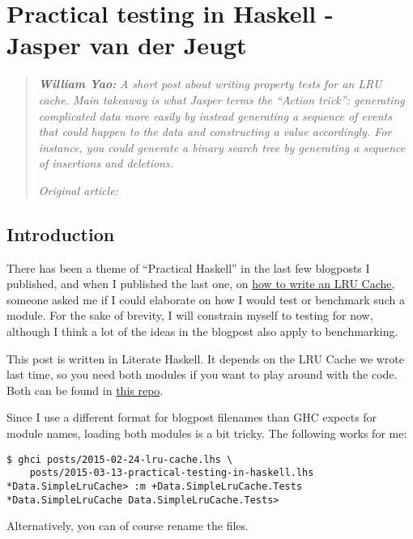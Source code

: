 \chapter{Practical testing in Haskell - Jasper van der Jeugt}


\begin{quotation}
\noindent\textit{\textbf{William Yao:}}
\textit{A short post about writing property tests for an LRU cache. Main takeaway is what Jasper terms the ``Action trick'': generating complicated data more easily by instead generating a sequence of events that could happen to the data and constructing a value accordingly. For instance, you could generate a binary search tree by generating a sequence of insertions and deletions.}

\vspace{\baselineskip}
\noindent\textit{Original article: \cite{practical_testing_in_haskell}}
\end{quotation}


\section{Introduction}

There has been a theme of ``Practical Haskell'' in the last few blogposts I published, and when I published the last one, on \href{https://jaspervdj.be/posts/2015-02-24-lru-cache.html}{how to write an LRU Cache}, someone asked me if I could elaborate on how I would test or benchmark such a module. For the sake of brevity, I will constrain myself to testing for now, although I think a lot of the ideas in the blogpost also apply to benchmarking.

This post is written in Literate Haskell. It depends on the LRU Cache we wrote last time, so you need both modules if you want to play around with the code. Both can be found in \href{https://github.com/jaspervdj/jaspervdj/}{this repo}.

Since I use a different format for blogpost filenames than GHC expects for module names, loading both modules is a bit tricky. The following works for me:

\begin{verbatim}
$ ghci posts/2015-02-24-lru-cache.lhs \
    posts/2015-03-13-practical-testing-in-haskell.lhs
*Data.SimpleLruCache> :m +Data.SimpleLruCache.Tests
*Data.SimpleLruCache Data.SimpleLruCache.Tests>
\end{verbatim}
Alternatively, you can of course rename the files.

